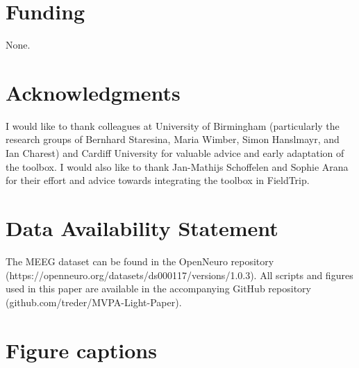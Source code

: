 \documentclass[utf8]{frontiersSCNS} %
\begin{document}
\section*{Funding}
None.

\section*{Acknowledgments}
I would like to thank colleagues at University of Birmingham (particularly the research groups of Bernhard Staresina, Maria Wimber, Simon Hanslmayr, and Ian Charest) and Cardiff University for valuable advice and early adaptation of the toolbox. I would also like to thank Jan-Mathijs Schoffelen and Sophie Arana for their effort and advice towards integrating the toolbox in FieldTrip.

\section*{Data Availability Statement}
The MEEG dataset can be found in the OpenNeuro repository (https://openneuro.org/datasets/ds000117/versions/1.0.3). All scripts and figures used in this paper are available in the accompanying GitHub repository (github.com/treder/MVPA-Light-Paper).




\section*{Figure captions}

\end{document}

